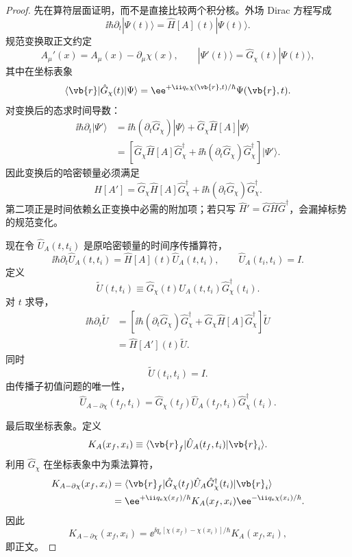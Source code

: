 \begin{proof}
先在算符层面证明，而不是直接比较两个积分核。外场 Dirac 方程写成
\[
\ii\hbar\partial_t|\Psi(t)\rangle
=
\hat H[A](t)|\Psi(t)\rangle .
\]
规范变换取正文约定
\[
A_\mu'(x)=A_\mu(x)-\partial_\mu\chi(x),
\qquad
|\Psi'(t)\rangle
=
\hat G_\chi(t)|\Psi(t)\rangle,
\]
其中在坐标表象
\[
\langle\vb{r}|\hat G_\chi(t)|\Psi\rangle
=
\ee^{+\ii q_{\mathrm e}\chi(\vb{r},t)/\hbar}
\Psi(\vb{r},t).
\]
对变换后的态求时间导数：
\begin{align*}
\ii\hbar\partial_t|\Psi'\rangle
&=
\ii\hbar(\partial_t\hat G_\chi)|\Psi\rangle
+\hat G_\chi\hat H[A]|\Psi\rangle\\
&=
\left[
\hat G_\chi\hat H[A]\hat G_\chi^\dagger
+\ii\hbar(\partial_t\hat G_\chi)\hat G_\chi^\dagger
\right]
|\Psi'\rangle.
\end{align*}
因此变换后的哈密顿量必须满足
\[
\hat H[A']
=
\hat G_\chi\hat H[A]\hat G_\chi^\dagger
+\ii\hbar(\partial_t\hat G_\chi)\hat G_\chi^\dagger.
\]
第二项正是时间依赖幺正变换中必需的附加项；若只写
\(\hat H'\!=\hat G\hat H\hat G^\dagger\)，会漏掉标势的规范变化。

现在令 \(\hat U_A(t,t_i)\) 是原哈密顿量的时间序传播算符，
\[
\ii\hbar\partial_t\hat U_A(t,t_i)
=
\hat H[A](t)\hat U_A(t,t_i),
\qquad
\hat U_A(t_i,t_i)=I.
\]
定义
\[
\widetilde U(t,t_i)
\equiv
\hat G_\chi(t)\hat U_A(t,t_i)\hat G_\chi^\dagger(t_i).
\]
对 \(t\) 求导，
\begin{align*}
\ii\hbar\partial_t\widetilde U
&=
\left[
\ii\hbar(\partial_t\hat G_\chi)\hat G_\chi^\dagger
+\hat G_\chi\hat H[A]\hat G_\chi^\dagger
\right]\widetilde U\\
&=
\hat H[A'](t)\widetilde U.
\end{align*}
同时
\[
\widetilde U(t_i,t_i)=I.
\]
由传播子初值问题的唯一性，
\[
{
\hat U_{A-\partial\chi}(t_f,t_i)
=
\hat G_\chi(t_f)
\hat U_A(t_f,t_i)
\hat G_\chi^\dagger(t_i).
}
\]

最后取坐标表象。定义
\[
K_A(x_f,x_i)
\equiv
\langle\vb{r}_f|
\hat U_A(t_f,t_i)
|\vb{r}_i\rangle .
\]
利用 \(\hat G_\chi\) 在坐标表象中为乘法算符，
\begin{align*}
K_{A-\partial\chi}(x_f,x_i)
&=
\langle\vb{r}_f|
\hat G_\chi(t_f)\hat U_A
\hat G_\chi^\dagger(t_i)
|\vb{r}_i\rangle\\
&=
\ee^{+\ii q_{\mathrm e}\chi(x_f)/\hbar}
K_A(x_f,x_i)
\ee^{-\ii q_{\mathrm e}\chi(x_i)/\hbar}.
\end{align*}
因此
\[
{
K_{A-\partial\chi}(x_f,x_i)
=
\ee^{\ii q_{\mathrm e}[\chi(x_f)-\chi(x_i)]/\hbar}
K_A(x_f,x_i),
}
\]
即正文。
\end{proof}

